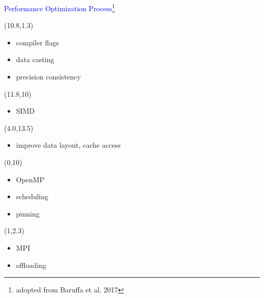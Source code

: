 \documentclass[11pt]{beamer}
\begin{document}
\begin{frame}{\textcolor{blue}{Performance Optimization Process}\footnote{adopted from Baruffa et al. 2017}}


\begin{center}
\end{center}

\begin{textblock}{6}(10.8,1.3)
\begin{itemize}
\item compiler flags
\item data casting
\item precision consistency
\end{itemize}
\end{textblock}


\begin{textblock}{6}(11.8,10)
\begin{itemize}
\item SIMD
\end{itemize}
\end{textblock}

\begin{textblock}{10}(4.0,13.5)
\begin{itemize}
\item improve data layout, cache access
\end{itemize}
\end{textblock}


\begin{textblock}{6}(0,10)
\begin{itemize}
\item OpenMP
\item scheduling
\item pinning
\end{itemize}
\end{textblock}


\begin{textblock}{6}(1,2.3)
\begin{itemize}
\item MPI
\item offloading
\end{itemize}
\end{textblock}

\end{frame}
\end{document}
